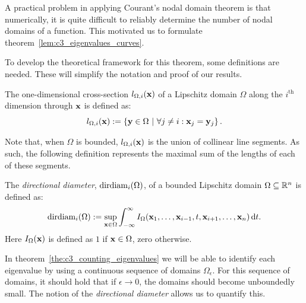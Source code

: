 A practical problem in applying Courant's nodal domain theorem is that numerically, it is quite difficult to reliably determine the number of nodal domains of a function. This motivated us to formulate theorem~\ref{lem:c3_eigenvalues_curves}.

To develop the theoretical framework for this theorem, some definitions are needed. These will simplify the notation and proof of our results.
\begin{definition}
  The one-dimensional cross-section $l_{\Omega,i}(\vb{x})$ of a Lipschitz domain $\Omega$ along the $i^\text{th}$ dimension through $\vb{x}$ is defined as:
  $$
    l_{\Omega,i}(\vb{x}) := \left\{\vb{y} \in \Omega \ |\  \forall j \neq i : \vb{x}_j = \vb{y}_j   \right\}\text{.}
  $$
\end{definition}

Note that, when $\Omega$ is bounded, $l_{\Omega,i}(\vb{x})$ is the union of collinear line segments. As such, the following definition represents the maximal sum of the lengths of each of these segments.

\begin{definition}
  The \emph{directional diameter}, $\operatorname{dirdiam}_i(\Omega)$, of a bounded Lipschitz domain $\Omega \subseteq \mathbb{R}^n$ is defined as:
  $$
    \operatorname{dirdiam}_i(\Omega) := \sup_{\vb{x}\in\Omega} \int_{-\infty}^{\infty} I_\Omega(\vb{x}_1, \dots, \vb{x}_{i-1}, t, \vb{x}_{i+1}, \dots, \vb{x}_n) \, \dd t \text{.}
  $$
  Here $I_\Omega(\vb{x})$ is defined as $1$ if $\vb{x} \in \Omega$, zero otherwise.
\end{definition}

In theorem~\ref{the:c3_counting_eigenvalues} we will be able to identify each eigenvalue by using a continuous sequence of domains $\Omega_\epsilon$. For this sequence of domains, it should hold that if $\epsilon \to 0$, the domains should become unboundedly small. The notion of the \emph{directional diameter} allows us to quantify this.


